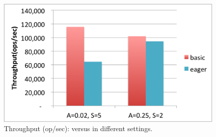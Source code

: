 \begin{figure}[htb]
\includegraphics[width=\figw]{Figs/eager-throughput.png}
\caption{Throughput (op/sec): \eager\/ versus \basic\/ in different settings.
}
\label{fig:eager-throughput}
\end{figure}




